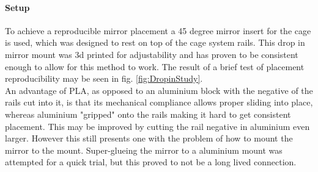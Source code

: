\documentclass[twoside,openright,listof=numbered]{scrreprt}
\begin{document}
\paragraph{Setup}
To achieve a reproducible mirror placement a 45 degree mirror insert for the cage is used, which was designed to rest on top of the cage system rails. This drop in mirror mount was 3d printed for adjustability and has proven to be consistent enough to allow for this method to work. The result of a brief test of placement reproducibility may be seen in fig. \ref{fig:DropinStudy}. \\
An advantage of PLA, as opposed to an aluminium block with the negative of the rails cut into it, is that its mechanical compliance allows proper sliding into place, whereas aluminium "gripped" onto the rails making it hard to get consistent placement. This may be improved by cutting the rail negative in aluminium even larger. However this still presents one with the problem of how to mount the mirror to the mount. Super-glueing  the mirror to a aluminium mount was attempted for a quick trial, but this proved to not be a long lived connection.\\
\end{document}
